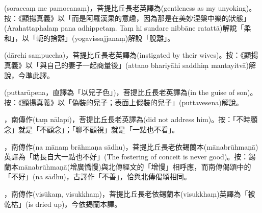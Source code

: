 \startitemgroup[noteitems]
\item{}(soraccaṃ me pamocanaṃ)，菩提比丘長老英譯為(gentleness as my unyoking)。按：《顯揚真義》以「而是阿羅漢果的意趣，因為那是在美妙涅槃中樂的狀態」(Arahattaphalaṃ pana adhippetaṃ. Taṃ hi sundare nibbāne ratattā)解說「柔和」，以「軛的捨離」(yogavissajjanaṃ)解說「脫離」。
\stopitemgroup

\startitemgroup[noteitems]
\item{}(dārehi saṃpuccha)，菩提比丘長老英譯為(instigated by their wives)。按：《顯揚真義》以「與自己的妻子一起商量後」(attano bhariyāhi saddhiṃ mantayitvā)解說，今準此譯。
\stopitemgroup

\startitemgroup[noteitems]
\item{}(puttarūpena，直譯為「以兒子色」)，菩提比丘長老英譯為(in the guise of son)。按：《顯揚真義》以「偽裝的兒子；表面上假裝的兒子」(puttavesena)解說。
\stopitemgroup

\startitemgroup[noteitems]
\item{}，南傳作(taṃ nālapi)，菩提比丘長老英譯為(did not address him)。按：「不時顧念」就是「不顧念」；「聊不顧視」就是「一點也不看」。
\stopitemgroup

\startitemgroup[noteitems]
\item{}，南傳作(na mānaṃ brāhmaṇa sādhu)，菩提比丘長老依錫蘭本(mānabrūhmaṇā)英譯為「助長自大一點也不好」(The fostering of conceit is never good)。按：錫蘭本mānabrūhmaṇā(增廣憍慢)與北傳經文的「增慢」相呼應，而南傳偈頌中的「不好」(na sādhu)，古譯作「不善」，恰與北傳偈頌相同。
\stopitemgroup

\startitemgroup[noteitems]
\item{}，南傳作(visūkaṃ, visukkhaṃ)，菩提比丘長老依錫蘭本(visukkhaṃ)英譯為「被乾枯」(is dried up)，今依錫蘭本譯。
\stopitemgroup

